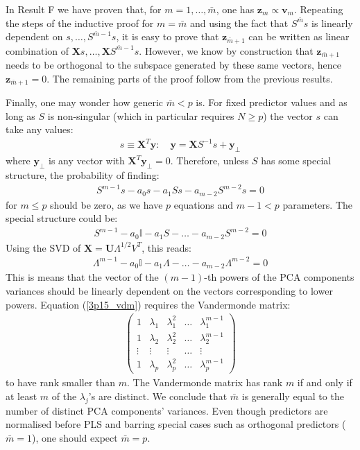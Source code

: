 \noindent In Result F we have proven that, for $m = 1, \ldots, \bar{m}$, one has $\mathbf{z}_m \propto \mathbf{v}_m$. Repeating the steps of the inductive proof for $m = \bar{m}$ and using the fact that
$S^{\bar{m}} s$ is linearly dependent on $s, \ldots, S^{\bar{m} -1}s$, it is easy to prove
that $\mathbf{z}_{\bar{m} + 1}$ can be written as linear combination of $\mathbf{X}s, \ldots, \mathbf{X}S^{\bar{m} - 1}s$. However, we know by construction that $\mathbf{z}_{\bar{m} + 1}$ needs
to be orthogonal to the subspace generated by these same vectors, hence $\mathbf{z}_{\bar{m} + 1} = 0$.
The remaining parts of the proof follow from the previous results.

\vspace{0.5cm} Finally, one may wonder how generic $\bar{m} < p$ is. For fixed predictor values and as long as $S$ is non-singular (which in particular requires $N \geq p$) the vector $s$ can take any values:
\begin{eqnarray*}
    s \equiv \mathbf{X}^T \mathbf{y}: \quad \mathbf{y} = \mathbf{X} S^{-1} s + \mathbf{y}_\perp
\end{eqnarray*}
where $\mathbf{y}_\perp$ is any vector with $\mathbf{X}^T \mathbf{y}_\perp = 0$. Therefore, unless
$S$ has some special structure, the probability of finding:
\begin{eqnarray*}
    S^{m - 1} s - a_0 s - a_1 S s - a_{m - 2} S^{m - 2} s = 0
\end{eqnarray*}
for $m \leq p$ should be zero, as we have $p$ equations and $m - 1 < p$ parameters. The special structure could be:
\begin{eqnarray*}
    S^{m - 1} - a_0 \mathbb{I} - a_1 S - \ldots - a_{m - 2} S^{m - 2} = 0
\end{eqnarray*}
Using the SVD of $\mathbf{X} = \mathbf{U} \Lambda^{1/2} V^T$, this reads:
\begin{eqnarray} \label{3p15_vdm}
\Lambda^{m - 1} - a_0 \mathbb{I} - a_1 \Lambda - \ldots - a_{m - 2} \Lambda^{m-2} = 0
\end{eqnarray}
This is means that the vector of the $(m - 1)$-th powers of the PCA components variances should be linearly dependent on the vectors corresponding to lower powers. Equation (\ref{3p15_vdm}) requires the Vandermonde matrix:
\begin{eqnarray*}
    \left(
    \begin{array}{ccccc}
        1 & \lambda_1 & \lambda_1^2 & \ldots & \lambda_{1}^{m - 1}\\
        1 & \lambda_2 & \lambda_2^2 & \ldots & \lambda_{2}^{m - 1}\\
        \vdots & \vdots & \vdots & \ldots & \vdots\\
        1 & \lambda_p & \lambda_p^2 & \ldots & \lambda_{p}^{m - 1}
    \end{array}
    \right)
\end{eqnarray*}
to have rank smaller than $m$. The Vandermonde
matrix has rank $m$ if and only if at least $m$ of the $\lambda_j$'s are distinct.
We conclude that $\bar{m}$ is generally equal to the number of distinct PCA components' variances. Even though predictors are normalised before
PLS and barring special cases such as orthogonal predictors ($\bar{m} = 1$), one should expect $\bar{m} = p$.